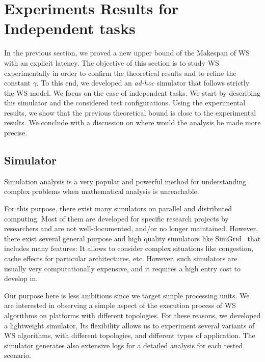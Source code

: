 \section{Experiments Results for Independent tasks}
\label{sec:experiemnts}

In the previous section, we proved a new upper bound of the Makespan
of WS with an explicit latency. The objective of this section is to
study WS experimentally in order to confirm the theoretical results
and to refine the constant $\gamma$. To this end, we developed an
\textit{ad-hoc} simulator that follows strictly the WS model. We focus on
the case of independent tasks. We start by describing this
simulator and the considered test configurations.  Using the
experimental results, we show that the previous theoretical bound is close to
the experimental results.  We conclude with a discussion on where
would the analysis be made more precise. 


\subsection{Simulator}

Simulation analysis is a very popular and powerful method 
for understanding complex problems when mathematical analysis is unreachable.

For this purpose, there exist many simulators on parallel and distributed computing.
Most of them are developed for specific research projects by researchers and are not well-documented,
and/or no longer maintained. However, there exist several general purpose and high quality simulators
like SimGrid~\cite{SIMGRID} that includes many features: It allows to consider complex
situations like congestion, cache effects for particular architectures, etc.
However, such simulators are usually very computationally expensive,
and it requires a high entry cost to develop in.

Our purpose here is less ambitious since we target simple processing
units. We are interested in observing a simple aspect of the execution process of WS
algorithms on platforms with different topologies.
For these reasons, we developed a lightweight simulator,
Its flexibility allows us to experiment several variants of WS algorithms,
with different topologies, and different types of application.
The simulator generates also extensive logs for a detailed analysis for each tested scenario.

